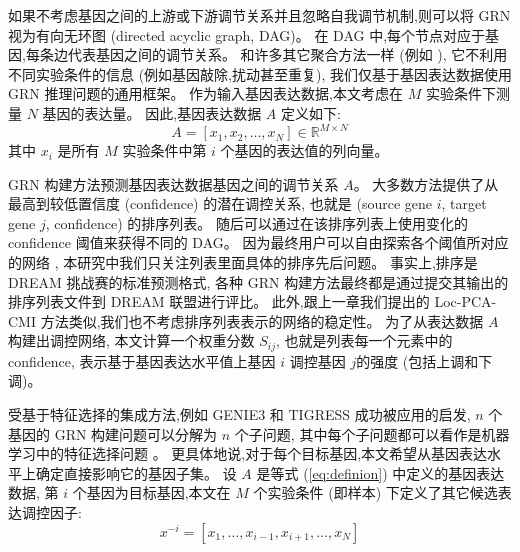 如果不考虑基因之间的上游或下游调节关系并且忽略自我调节机制,则可以将 GRN 视为有向无环图 (directed acyclic graph, DAG)。
在 DAG 中,每个节点对应于基因,每条边代表基因之间的调节关系。
和许多其它聚合方法一样 (例如 ),
它不利用不同实验条件的信息 (例如基因敲除,扰动甚至重复),
我们仅基于基因表达数据使用 GRN 推理问题的通用框架。
作为输入基因表达数据,本文考虑在 $M$ 实验条件下测量 $N$ 基因的表达量。
因此,基因表达数据 $A$ 定义如下:
\begin{equation}
\label{eq:definion}
A = [x_1,x_2,\ldots,x_N] \in \mathbb{R} ^ {M \times N}
\end{equation}
其中 $x_i$ 是所有 $M$ 实验条件中第 $i$ 个基因的表达值的列向量。

GRN 构建方法预测基因表达数据基因之间的调节关系 $A$。
大多数方法提供了从最高到较低置信度 (confidence) 的潜在调控关系,
也就是 (source gene $i$, target gene $j$, confidence) 的排序列表。
随后可以通过在该排序列表上使用变化的 confidence 阈值来获得不同的 DAG。
因为最终用户可以自由探索各个阈值所对应的网络 ,
本研究中我们只关注列表里面具体的排序先后问题。
事实上,排序是 DREAM  挑战赛的标准预测格式,
各种 GRN 构建方法最终都是通过提交其输出的排序列表文件到 DREAM 联盟进行评比。
此外,跟上一章我们提出的 Loc-PCA-CMI 方法类似,我们也不考虑排序列表表示的网络的稳定性。
为了从表达数据 $A$ 构建出调控网络,
本文计算一个权重分数 $S_{ij}$, 也就是列表每一个元素中的 confidence,
表示基于基因表达水平值上基因 $i$ 调控基因 $j$的强度 (包括上调和下调)。


受基于特征选择的集成方法,例如 GENIE3  和 TIGRESS  成功被应用的启发,
$n$ 个基因的 GRN 构建问题可以分解为 $n$ 个子问题,
其中每个子问题都可以看作是机器学习中的特征选择问题 。
更具体地说,对于每个目标基因,本文希望从基因表达水平上确定直接影响它的基因子集。
设 $A$ 是等式 (\ref{eq:definion}) 中定义的基因表达数据,
第 $i$ 个基因为目标基因,本文在 $M$ 个实验条件 (即样本) 下定义了其它候选表达调控因子:
\begin{equation}
  \label{eq:x}
  x^{-i} = [x_1,\ldots,x_{i-1},x_{i+1},\ldots,x_N]
  \end{equation}


